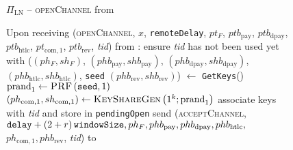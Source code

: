   \begin{figure}[H]
    \begin{protocolbox}{$\Pi_{\mathrm{LN}}$ -- \textsc{openChannel} from \bob}
      \begin{algorithmic}[1]
        \State Upon receiving (\textsc{openChannel}, $x$, \texttt{remoteDelay},
        $pt_F$, $ptb_{\mathrm{pay}}$, $ptb_{\mathrm{dpay}}$,
        $ptb_{\mathrm{htlc}}$, $pt_{\mathrm{com}, 1}$, $ptb_{\mathrm{rev}}$,
        \textit{tid}) from \bob:
        \Indent
          \State ensure \textit{tid} has not been used yet with \bob
          \State ($(ph_F, sh_F)$, $(phb_{\mathrm{pay}}, shb_{\mathrm{pay}})$,
          $(phb_{\mathrm{dpay}}, shb_{\mathrm{dpay}})$, $(phb_{\mathrm{htlc}},
          shb_{\mathrm{htlc}})$, \texttt{seed} $(phb_{\mathrm{rev}},
          shb_{\mathrm{rev}})$) $\gets$ \texttt{GetKeys}()
          \State $\mathrm{prand}_1 \gets \textsc{PRF}\left(\mathtt{seed},
          1\right)$
          \label{alg:protocol:open:peer:prf}
          \State $\left(ph_{\mathrm{com}, 1}, sh_{\mathrm{com}, 1}\right) \gets
          \textsc{KeyShareGen}\left(1^k; \mathrm{prand}_1\right)$
          \State associate keys with \textit{tid} and store in
          \texttt{pendingOpen}
          \label{alg:protocol:open:openChannel:pendingOpen}
          \State send (\textsc{acceptChannel}, $\mathtt{delay}  + \left(2 + r\right)\texttt{windowSize},
          ph_F, phb_{\mathrm{pay}}, phb_{\mathrm{dpay}}, phb_{\mathrm{htlc}},$
          $ph_{\mathrm{com}, 1}, phb_{\mathrm{rev}}$, \textit{tid}) to \bob{}
        \EndIndent
      \end{algorithmic}
    \end{protocolbox}
    \caption{}
    \label{alg:protocol:open:openChannel}
  \end{figure}


